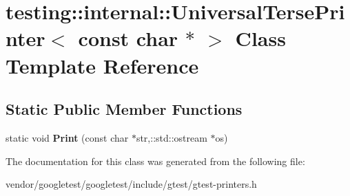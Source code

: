 \hypertarget{classtesting_1_1internal_1_1UniversalTersePrinter_3_01const_01char_01_5_01_4}{}\section{testing\+:\+:internal\+:\+:Universal\+Terse\+Printer$<$ const char $\ast$ $>$ Class Template Reference}
\label{classtesting_1_1internal_1_1UniversalTersePrinter_3_01const_01char_01_5_01_4}
\subsection*{Static Public Member Functions}
\begin{DoxyCompactItemize}
\item 
static void {\bfseries Print} (const char $\ast$str,\+::std\+::ostream $\ast$os)\hypertarget{classtesting_1_1internal_1_1UniversalTersePrinter_3_01const_01char_01_5_01_4_aa7bc28677539f2f151e8fbcd9c573655}{}\label{classtesting_1_1internal_1_1UniversalTersePrinter_3_01const_01char_01_5_01_4_aa7bc28677539f2f151e8fbcd9c573655}

\end{DoxyCompactItemize}


The documentation for this class was generated from the following file\+:\begin{DoxyCompactItemize}
\item 
vendor/googletest/googletest/include/gtest/gtest-\/printers.\+h\end{DoxyCompactItemize}
